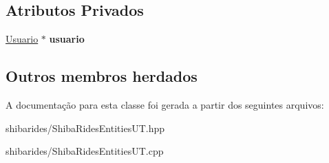 \subsection*{Atributos Privados}
\begin{DoxyCompactItemize}
\item 
\hyperlink{classshibarides_1_1Usuario}{Usuario} $\ast$ {\bfseries usuario}\hypertarget{classshibarides_1_1TUUsuario_af6ceda9a74b6bc5735c6c635eca43573}{}\label{classshibarides_1_1TUUsuario_af6ceda9a74b6bc5735c6c635eca43573}

\end{DoxyCompactItemize}
\subsection*{Outros membros herdados}


A documentação para esta classe foi gerada a partir dos seguintes arquivos\+:\begin{DoxyCompactItemize}
\item 
shibarides/Shiba\+Rides\+Entities\+U\+T.\+hpp\item 
shibarides/Shiba\+Rides\+Entities\+U\+T.\+cpp\end{DoxyCompactItemize}

